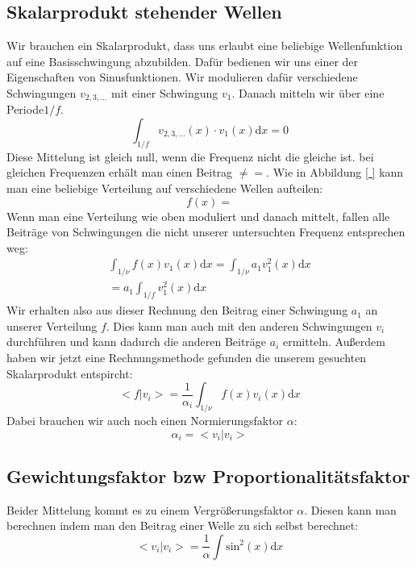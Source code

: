 \subsection{Skalarprodukt stehender Wellen}
Wir brauchen ein Skalarprodukt, dass uns erlaubt eine beliebige Wellenfunktion auf eine Basisschwingung abzubilden. Dafür bedienen wir uns einer der Eigenschaften von Sinusfunktionen.
Wir modulieren dafür verschiedene Schwingungen $v_{2,3,\dots}$ mit einer Schwingung $v_1$. Danach mitteln wir über eine Periode$1/f$.
\begin{equation}
	\int_{1/f}  v_{2,3,\dots} (x) \cdot v_1(x) \mathrm{d}x = 0
\end{equation}
Diese Mittelung ist gleich null, wenn die Frequenz nicht die gleiche ist. bei gleichen Frequenzen erhält man einen Beitrag $\neq=$.
Wie in Abbildung \ref{ } kann man eine beliebige Verteilung auf verschiedene Wellen aufteilen:
\begin{equation}
	f(x) = 
\end{equation}
Wenn man eine Verteilung wie oben moduliert und danach mittelt, fallen alle Beiträge von Schwingungen die nicht unserer untersuchten Frequenz entsprechen weg:
\begin{multline}
	\int_{1/\nu} f(x) v_1(x) \mathrm{d}x=\int_{1/\nu} a_1v_1^2(x)  \mathrm{d}x\\
	=a_1\int_{1/f} v_1^2(x)  \mathrm{d}x
\end{multline}
Wir erhalten also aus dieser Rechnung den Beitrag einer Schwingung $a_1$ an unserer Verteilung $f$. Dies kann man auch mit den anderen Schwingungen $v_i$ durchführen und kann dadurch die anderen Beiträge $a_i$ ermitteln. Außerdem haben wir jetzt eine Rechnungsmethode gefunden die unserem gesuchten Skalarprodukt entspircht:
\begin{equation}
	< f | v_i > =  \frac{1}{\alpha_i}\int_{1/\nu} f(x) v_i(x) \mathrm{d}x
\end{equation}
Dabei brauchen wir auch noch einen Normierungsfaktor $\alpha$:
\begin{equation}
	\alpha_i = <v_i| v_i>
\end{equation}

\subsection{Gewichtungsfaktor bzw Proportionalitätsfaktor}
Beider Mittelung kommt es zu einem Vergrößerungsfaktor $\alpha$. Diesen kann man berechnen indem man den Beitrag einer Welle zu sich selbst berechnet:
\begin{equation}
	< v_i|v_i> = \frac{1}{\alpha} \int \mathrm{sin}^2(x) \mathrm{d}x
\end{equation}


